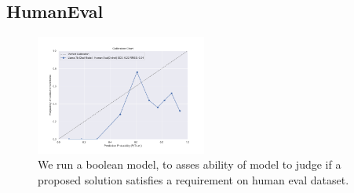 \documentclass[11pt]{article}
\begin{document}

\FloatBarrier

\subsection{HumanEval}

\begin{figure}
  \includegraphics[width=0.5\textwidth]{figures/0-shot-7b-human-eval.png}
  \caption{We run a boolean model, to asses ability of model to judge if a proposed solution satisfies a requirement on human eval dataset.}
  \label{fig:human-eval-results}
\end{figure}
\end{document}
